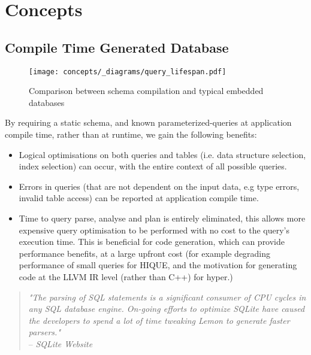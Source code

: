 \chapter{Concepts}

\section{Compile Time Generated Database}
\begin{figure}[h!]
    \centering
    \texttt{[image: concepts/\_diagrams/query\_lifespan.pdf]}
    \caption{Comparison between schema compilation and typical embedded databases}
\end{figure}
\noindent
By requiring a static schema, and known parameterized-queries at application compile time, rather than at runtime, we gain the following benefits:
\begin{itemize}
    \setlength\itemsep{0em}
    \item Logical optimisations on both queries and tables (i.e. data structure selection, index selection) can occur, with the entire context of all possible queries.
    \item Errors in queries (that are not dependent on the input data, e.g type errors, invalid table access) can be reported at application compile time.
    \item Time to query parse, analyse and plan is entirely eliminated, this allows more expensive query optimisation to be performed with no cost to the query's execution time.
          This is beneficial for code generation, which can provide performance benefits, at a large upfront cost (for example degrading performance of small queries for HIQUE\cite{HIQUEPaper}, and the motivation for generating code at the LLVM IR level (rather than C++) for hyper\cite{HyperCodegen}.)
\end{itemize}
\begin{quote}
    \textit{"The parsing of SQL statements is a significant consumer of CPU cycles in any SQL database engine. On-going efforts to optimize SQLite have caused the developers to spend a lot of time tweaking Lemon to generate faster parsers."}
    \\ \vspace{0.5cm}
    \hfill -- \textit{SQLite Website\cite{SQLiteLemonParser}}
\end{quote}

